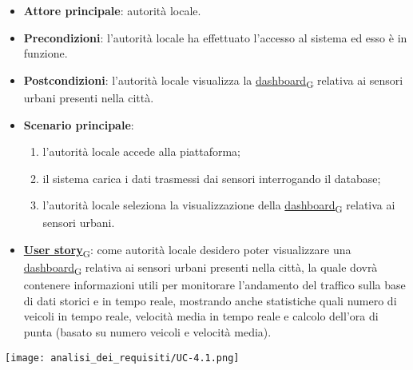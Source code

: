 \begin{itemize}
	\item \textbf{Attore principale}: autorità locale.
	\item \textbf{Precondizioni}: l'autorità locale ha effettuato l'accesso al sistema ed esso è in funzione.
	\item \textbf{Postcondizioni}: l'autorità locale visualizza la \href{https://7last.github.io/docs/pb/documentazione-interna/glossario\#dashboard}{dashboard\textsubscript{G}} relativa
	      ai sensori urbani presenti nella città.
	\item \textbf{Scenario principale}:
	      \begin{enumerate}
		      \item l'autorità locale accede alla piattaforma;
		      \item il sistema carica i dati trasmessi dai sensori interrogando il database;
		      \item l'autorità locale seleziona la visualizzazione della \href{https://7last.github.io/docs/pb/documentazione-interna/glossario\#dashboard}{dashboard\textsubscript{G}} relativa ai sensori urbani.
	      \end{enumerate}
	\item \href{https://7last.github.io/docs/pb/documentazione-interna/glossario\#user-story}{\textbf{User story}\textsubscript{G}}:
	      come autorità locale desidero poter visualizzare una \href{https://7last.github.io/docs/pb/documentazione-interna/glossario\#dashboard}{dashboard\textsubscript{G}} relativa ai sensori urbani presenti nella città, la quale
	      dovrà contenere informazioni utili per monitorare l'andamento del traffico sulla base di dati storici e in tempo reale, mostrando
	      anche statistiche quali numero di veicoli in tempo reale, velocità media in tempo reale e calcolo dell'ora di punta (basato su numero veicoli e velocità media).
\end{itemize}
\begin{center}
	\texttt{[image: analisi\_dei\_requisiti/UC-4.1.png]}
\end{center}


